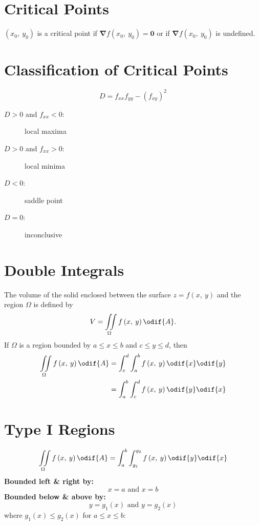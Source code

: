 \documentclass{article}
\begin{document}
\begin{multicols}{3}
    \section*{Critical Points}
    \(\left( x_0,\: y_0 \right)\) is a critical point if \(\symbf{\nabla}f\left( x_0,\: y_0 \right) = \symbf{0}\)
    or if \(\symbf{\nabla}f\left( x_0,\: y_0 \right)\) is undefined.
    \section*{Classification of Critical Points}
    \begin{equation*}
        D = f_{xx}f_{yy} - \left( f_{xy} \right)^2
    \end{equation*}
    \begin{description}
        \item[\(D > 0\) and \(f_{xx} < 0\):] local maxima
        \item[\(D > 0\) and \(f_{xx} > 0\):] local minima
        \item[\(D < 0\):] saddle point
        \item[\(D = 0\):] inconclusive
    \end{description}
    \section*{Double Integrals}
    The volume of the solid
    enclosed between the surface \(z=f\left( x,\: y \right)\) and the region \(\Omega\) is
    defined by
    \begin{equation*}
        V = \iint\limits_{\Omega} f\left( x,\: y \right) \odif{A}.
    \end{equation*}
    If \(\Omega\) is a region bounded by \(a \leq x \leq b\) and \(c \leq y \leq d\), then
    \begin{align*}
        \iint\limits_{\Omega} f\left( x,\: y \right) \odif{A} & = \int_c^d\int_a^b f\left( x,\: y \right) \odif{x} \odif{y} \\
                                                              & = \int_a^b\int_c^d f\left( x,\: y \right) \odif{y} \odif{x}
    \end{align*}
    \section*{Type I Regions}
    \begin{equation*}
        \iint\limits_{\Omega} f\left( x,\: y \right) \odif{A} = \int_a^b\int_{g_1}^{g_2} f\left( x,\: y \right) \odif{y} \odif{x}
    \end{equation*}
    \textbf{Bounded left \& right by:}
    \begin{equation*}
        x=a \text{ and } x=b
    \end{equation*}
    \textbf{Bounded below \& above by:}
    \begin{equation*}
        y=g_1\left( x \right) \text{ and } y=g_2\left( x \right)
    \end{equation*}
    where \(g_1\left( x \right) \leq g_2\left( x \right)\) for \(a \leq x \leq b\):

\end{multicols}
\end{document}
